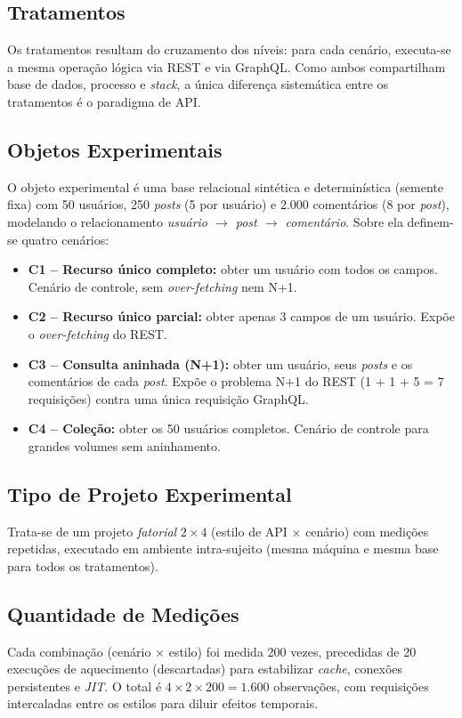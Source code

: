 \documentclass[conference]{IEEEtran}
\begin{document}
\subsection{Tratamentos}
Os tratamentos resultam do cruzamento dos níveis: para cada cenário, executa-se
a mesma operação lógica via REST e via GraphQL. Como ambos compartilham base de
dados, processo e \textit{stack}, a única diferença sistemática entre os
tratamentos é o paradigma de API.

\subsection{Objetos Experimentais}
\label{sec:cenarios}
O objeto experimental é uma base relacional sintética e determinística
(semente fixa) com 50 usuários, 250 \textit{posts} (5 por usuário) e 2.000
comentários (8 por \textit{post}), modelando o relacionamento
\textit{usuário $\rightarrow$ post $\rightarrow$ comentário}. Sobre ela definem-se
quatro cenários:
\begin{itemize}
  \item \textbf{C1 -- Recurso único completo:} obter um usuário com todos os
  campos. Cenário de controle, sem \textit{over-fetching} nem N+1.
  \item \textbf{C2 -- Recurso único parcial:} obter apenas 3 campos de um
  usuário. Expõe o \textit{over-fetching} do REST.
  \item \textbf{C3 -- Consulta aninhada (N+1):} obter um usuário, seus
  \textit{posts} e os comentários de cada \textit{post}. Expõe o problema N+1
  do REST (1 + 1 + 5 = 7 requisições) contra uma única requisição GraphQL.
  \item \textbf{C4 -- Coleção:} obter os 50 usuários completos. Cenário de
  controle para grandes volumes sem aninhamento.
\end{itemize}

\subsection{Tipo de Projeto Experimental}
Trata-se de um projeto \textit{fatorial} $2 \times 4$ (estilo de API $\times$
cenário) com medições repetidas, executado em ambiente intra-sujeito (mesma
máquina e mesma base para todos os tratamentos).

\subsection{Quantidade de Medições}
Cada combinação (cenário $\times$ estilo) foi medida 200 vezes, precedidas de
20 execuções de aquecimento (descartadas) para estabilizar \textit{cache},
conexões persistentes e \textit{JIT}. O total é
$4 \times 2 \times 200 = 1.600$ observações, com requisições intercaladas entre
os estilos para diluir efeitos temporais.
\end{document}
